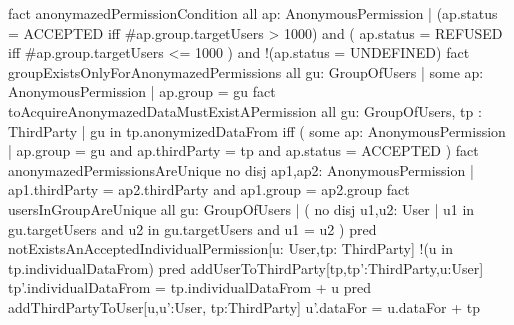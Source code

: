 \documentclass[a4paper]{article}
\begin{document}
{\newline fact anonymazedPermissionCondition {
\newline all ap: AnonymousPermission | (ap.status = ACCEPTED iff #ap.group.targetUsers > 1000) and ( ap.status = REFUSED iff #ap.group.targetUsers <= 1000  ) and !(ap.status = UNDEFINED)
\newline }
\newline 
\newline fact groupExistsOnlyForAnonymazedPermissions {
\newline all gu: GroupOfUsers | some ap: AnonymousPermission | ap.group = gu
\newline }
\newline 
\newline fact toAcquireAnonymazedDataMustExistAPermission{
\newline all gu: GroupOfUsers, tp : ThirdParty |  gu in tp.anonymizedDataFrom iff ( some ap: AnonymousPermission | ap.group = gu and ap.thirdParty = tp and ap.status = ACCEPTED )
\newline }
\newline 
\newline fact anonymazedPermissionsAreUnique {
\newline no disj ap1,ap2: AnonymousPermission | ap1.thirdParty = ap2.thirdParty and ap1.group = ap2.group
\newline }
\newline 
\newline fact usersInGroupAreUnique {
\newline all gu: GroupOfUsers | ( no disj u1,u2: User | u1 in gu.targetUsers and u2 in gu.targetUsers and u1 = u2 )
\newline }
\newline 
\newline pred notExistsAnAcceptedIndividualPermission[u: User,tp: ThirdParty] {
\newline 	!(u in tp.individualDataFrom)
\newline }
\newline 
\newline pred addUserToThirdParty[tp,tp':ThirdParty,u:User] {
\newline 	tp'.individualDataFrom = tp.individualDataFrom + u
\newline }
\newline 
\newline pred addThirdPartyToUser[u,u':User, tp:ThirdParty] {
\newline 	u'.dataFor = u.dataFor + tp
}}
\end{document}
